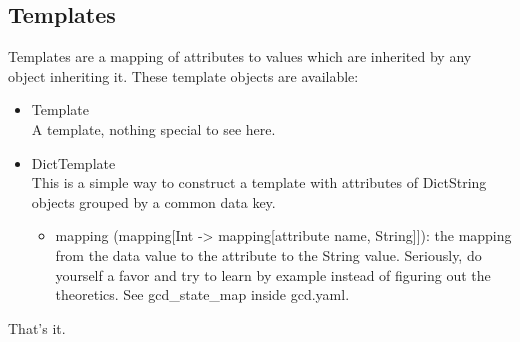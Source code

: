 \documentclass[11pt]{article}
\begin{document}
\subsection {Templates}
Templates are a mapping of attributes to values which are inherited by any object inheriting it. These template objects are available:
\begin{itemize}
  \item Template \\
  A template, nothing special to see here.
  \item DictTemplate \\
  This is a simple way to construct a template with attributes of DictString objects grouped by a common data key.
  \begin{itemize}
    \item mapping (mapping[Int -> mapping[attribute name, String]]): the mapping from the data value to the attribute to the String value. Seriously, do yourself a favor and try to learn by example instead of figuring out the theoretics. See gcd\_state\_map inside gcd.yaml.
  \end{itemize}
\end{itemize}

That's it.
\end{document}
